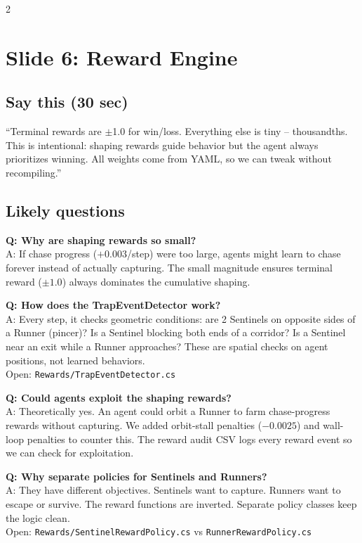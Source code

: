 \documentclass[9pt,a4paper]{article}
\begin{document}
\begin{multicols}{2}
\section{Slide 6: Reward Engine}

\subsection{Say this (30 sec)}
``Terminal rewards are $\pm$1.0 for win/loss. Everything else is tiny -- thousandths. This is intentional: shaping rewards guide behavior but the agent always prioritizes winning. All weights come from YAML, so we can tweak without recompiling.''

\subsection{Likely questions}
\textbf{Q: Why are shaping rewards so small?} \\
A: If chase progress ($+0.003$/step) were too large, agents might learn to chase forever instead of actually capturing. The small magnitude ensures terminal reward ($\pm1.0$) always dominates the cumulative shaping.

\textbf{Q: How does the TrapEventDetector work?} \\
A: Every step, it checks geometric conditions: are 2 Sentinels on opposite sides of a Runner (pincer)? Is a Sentinel blocking both ends of a corridor? Is a Sentinel near an exit while a Runner approaches? These are spatial checks on agent positions, not learned behaviors. \\
{\scriptsize\color{gray} Open: \texttt{Rewards/TrapEventDetector.cs}}

\textbf{Q: Could agents exploit the shaping rewards?} \\
A: Theoretically yes. An agent could orbit a Runner to farm chase-progress rewards without capturing. We added orbit-stall penalties ($-0.0025$) and wall-loop penalties to counter this. The reward audit CSV logs every reward event so we can check for exploitation.

\textbf{Q: Why separate policies for Sentinels and Runners?} \\
A: They have different objectives. Sentinels want to capture. Runners want to escape or survive. The reward functions are inverted. Separate policy classes keep the logic clean. \\
{\scriptsize\color{gray} Open: \texttt{Rewards/SentinelRewardPolicy.cs} vs \texttt{RunnerRewardPolicy.cs}}


\end{multicols}
\end{document}
